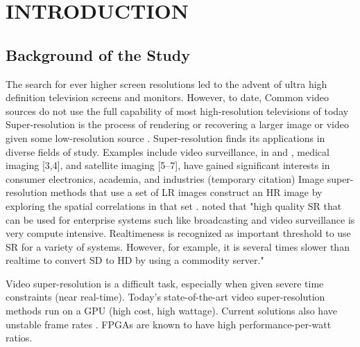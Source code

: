 
\chapter{INTRODUCTION} %

\label{Chapter1} %



\section{Background of the Study}
The search for ever higher screen resolutions led to the advent of ultra high definition television screens and monitors. However, to date, 
Common video sources do not use the full capability of most high-resolution televisions of today
Super-resolution is the process of rendering or recovering a larger image or video given some low-resolution source \citep{Dong2014}.
Super-resolution finds its applications in diverse fields of study. Examples include video surveillance, in \cite{Caner2003} and \cite{Zhang2010},  medical imaging [3,4], and satellite imaging [5–7], have gained significant interests in consumer electronics, academia, and industries (temporary citation)  \citep{Cheng2013}
Image super-resolution methods that use a set of LR images construct an HR image by exploring the spatial correlations in that set \citep{Cheng2013}.
\cite{Ishizaka2013} noted that "high quality SR that can be used for enterprise systems such like broadcasting and video surveillance is very compute intensive. Realtimeness is recognized as important threshold to use SR for a variety of systems. However, for example, it is several times slower than realtime to convert SD to HD by using a commodity server."

Video super-resolution is a difficult task, especially when given severe time constraints (near real-time). 
Today's state-of-the-art video super-resolution methods run on a GPU (high cost, high wattage).
Current solutions also have unstable frame rates \citep{Wu2011}.
FPGAs are known to have high performance-per-watt ratios.


